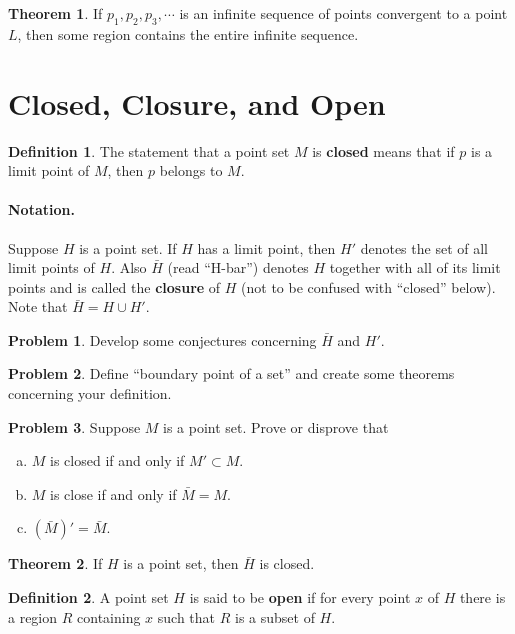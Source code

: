 \documentclass{article}
\theoremstyle{definition}
\newtheorem{definition}{Definition}
\newtheorem{theorem}{Theorem}
\theoremstyle{definition}
\newtheorem{problem}{Problem}
\theoremstyle{plain}
\begin{document}
\begin{theorem}
  If $p_1, p_2, p_3, \cdots$ is an infinite sequence of points convergent to a
  point $L$, then some region contains the entire infinite sequence.
\end{theorem}

\section*{Closed, Closure, and Open}

\begin{definition}
  The statement that a point set $M$ is \textbf{closed} means that if $p$ is a
  limit point of $M$, then $p$ belongs to $M$.
\end{definition}

\paragraph{Notation.}  Suppose $H$ is a point set.  If $H$ has a limit point,
then $H'$ denotes the set of all limit points of $H$.  Also $\bar{H}$
(read ``H-bar'') denotes $H$ together with all of its limit points and is
called the \textbf{closure} of $H$ (not to be confused with ``closed'' below).
Note that $\bar{H} = H \cup H'$.

\begin{problem}
  Develop some conjectures concerning $\bar{H}$ and $H'$.
\end{problem}

\begin{problem}
  Define ``boundary point of a set'' and create some theorems concerning your
  definition.
\end{problem}

\begin{problem}
  Suppose $M$ is a point set.  Prove or disprove that
  \begin{enumerate}[a.]
    \item $M$ is closed if and only if $M' \subset M$.
    \item $M$ is close if and only if $\bar{M} = M$.
    \item $(\bar{M})' = \bar{M}$.
  \end{enumerate}
\end{problem}

\begin{theorem}
  If $H$ is a point set, then $\bar{H}$ is closed.
\end{theorem}

\begin{definition}
  A point set $H$ is said to be \textbf{open} if for every point $x$ of $H$
  there is a region $R$ containing $x$ such that $R$ is a subset of $H$.
\end{definition}
\end{document}
